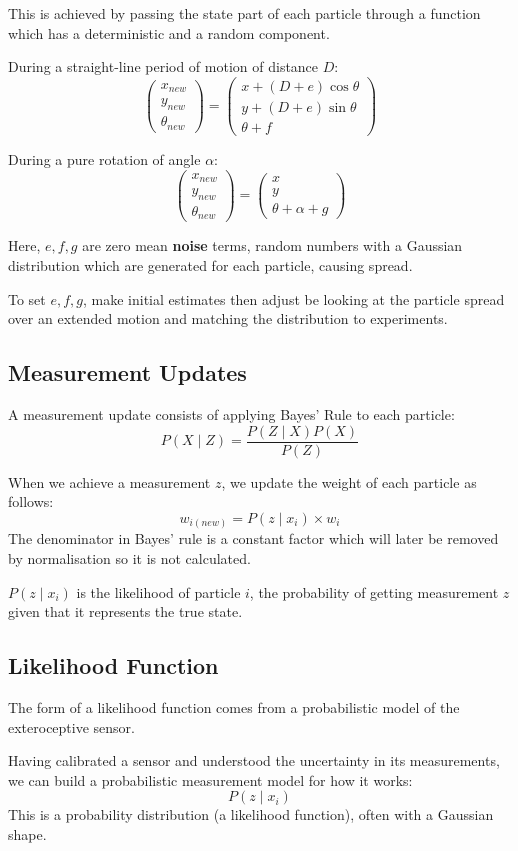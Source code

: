 \documentclass[11pt]{article}
\begin{document}
This is achieved by passing the state part of each particle through a function which has a deterministic and a random component.

During a straight-line period of motion of distance $D$:
\[
  \begin{pmatrix}
    x_{new} \\
    y_{new} \\
    \theta_{new}
  \end{pmatrix}
  =
  \begin{pmatrix}
    x + (D + e)\cos \theta \\
    y + (D + e)\sin \theta \\
    \theta + f
  \end{pmatrix}
\]

During a pure rotation of angle $\alpha$:
\[
  \begin{pmatrix}
    x_{new} \\
    y_{new} \\
    \theta_{new}
  \end{pmatrix}
  =
  \begin{pmatrix}
    x \\
    y \\
    \theta + \alpha + g
  \end{pmatrix}
\]

Here, $e, f, g$ are zero mean \textbf{noise} terms, random numbers with a Gaussian distribution which are generated for each particle, causing spread.

To set $e, f, g$, make initial estimates then adjust be looking at the particle spread over an extended motion and matching the distribution to experiments.

\subsection{Measurement Updates}
A measurement update consists of applying Bayes' Rule to each particle:
\[
  P(X \mid Z) = \frac{P(Z \mid X) P(X)}{P(Z)}
\]

When we achieve a measurement $z$, we update the weight of each particle as follows:
\[
  w_{i(new)} = P(z \mid x_i) \times w_i
\]
The denominator in Bayes' rule is a constant factor which will later be removed by normalisation so it is not calculated.

$P(z \mid x_i)$ is the likelihood of particle $i$, the probability of getting measurement $z$ given that it represents the true state.

\subsection{Likelihood Function}
The form of a likelihood function comes from a probabilistic model of the exteroceptive sensor.

Having calibrated a sensor and understood the uncertainty in its measurements, we can build a probabilistic measurement model for how it works:
\[
  P(z \mid x_i)
\]
This is a probability distribution (a likelihood function), often with a Gaussian shape.
\end{document}
